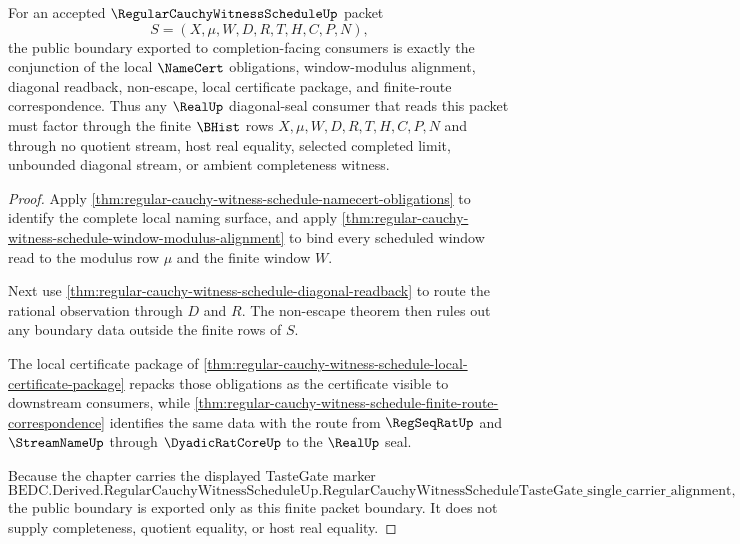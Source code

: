 \begin{theorem}
\label{thm:regular-cauchy-witness-schedule-public-boundary}
For an accepted $\RegularCauchyWitnessScheduleUp$ packet
$$
S=(X,\mu,W,D,R,T,H,C,P,N),
$$
the public boundary exported to completion-facing consumers is exactly the conjunction of the local $\NameCert$ obligations, window-modulus alignment, diagonal readback, non-escape, local certificate package, and finite-route correspondence. Thus any $\RealUp$ diagonal-seal consumer that reads this packet must factor through the finite $\BHist$ rows $X,\mu,W,D,R,T,H,C,P,N$ and through no quotient stream, host real equality, selected completed limit, unbounded diagonal stream, or ambient completeness witness.
\end{theorem}
\begin{proof}
Apply \autoref{thm:regular-cauchy-witness-schedule-namecert-obligations} to identify the complete local naming surface, and apply \autoref{thm:regular-cauchy-witness-schedule-window-modulus-alignment} to bind every scheduled window read to the modulus row $\mu$ and the finite window $W$.

Next use \autoref{thm:regular-cauchy-witness-schedule-diagonal-readback} to route the rational observation through $D$ and $R$. The non-escape theorem then rules out any boundary data outside the finite rows of $S$.

The local certificate package of \autoref{thm:regular-cauchy-witness-schedule-local-certificate-package} repacks those obligations as the certificate visible to downstream consumers, while \autoref{thm:regular-cauchy-witness-schedule-finite-route-correspondence} identifies the same data with the route from $\RegSeqRatUp$ and $\StreamNameUp$ through $\DyadicRatCoreUp$ to the $\RealUp$ seal.

Because the chapter carries the displayed TasteGate marker
$$
\text{BEDC.Derived.RegularCauchyWitnessScheduleUp.RegularCauchyWitnessScheduleTasteGate\_single\_carrier\_alignment},
$$
the public boundary is exported only as this finite packet boundary. It does not supply completeness, quotient equality, or host real equality.
\end{proof}

